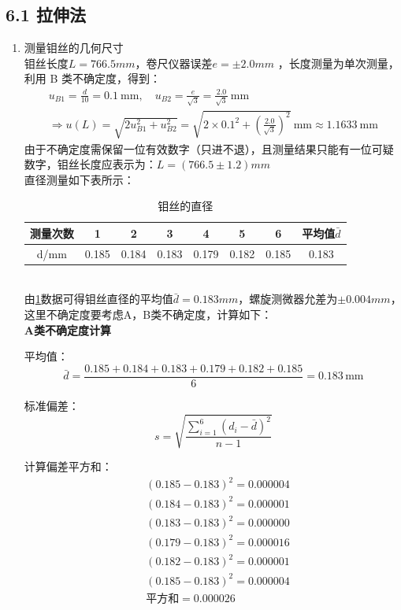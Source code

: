 \documentclass[11pt]{article}
\begin{document}
\subsection*{6.1 拉伸法} 
\begin{enumerate}
    \item  测量钼丝的几何尺寸 \\
    钼丝长度$L=766.5mm$，卷尺仪器误差$e=\pm 2.0mm$ ，长度测量为单次测量，利用 B 类不确定度，得到：
    \begin{gather}
    u_{B1} = \frac{d}{10} = 0.1 \ \mathrm{mm} ,\quad 
    u_{B2} = \frac{e}{\sqrt{3}} = \frac{2.0}{\sqrt{3}} \ \mathrm{mm} \\
    \Longrightarrow 
    u(L) = \sqrt{2u_{B1}^2 + u_{B2}^2} = \sqrt{2\times 0.1^2 + \left(\frac{2.0}{\sqrt{3}}\right)^2} \ \mathrm{mm} \approx 1.1633 \ \mathrm{mm}
    \end{gather}
    由于不确定度需保留一位有效数字（只进不退），且测量结果只能有一位可疑数字，钼丝长度应表示为：$L = (766.5 \pm 1.2)mm$ \\
    直径测量如下表所示：
    \begin{table}[h]
    \centering
    \begin{tabular}{@{}cccccccc@{}}
    \toprule
    测量次数 & 1     & 2     & 3     & 4     & 5     & 6     & 平均值$\bar{d}$ \\ \midrule
    d/mm & 0.185 & 0.184 & 0.183 & 0.179 & 0.182 & 0.185 & 0.183        \\ \bottomrule
    \end{tabular}
    \caption{钼丝的直径}
    \label{tab:dia of mu}
    \end{table} \\
    由\cref{tab:dia of mu}数据可得钼丝直径的平均值$\bar{d}=0.183mm$，螺旋测微器允差为$\pm 0.004mm$，这里不确定度要考虑A，B类不确定度，计算如下：\\
    \textbf{A类不确定度计算}
    
    平均值：
    \[
    \bar{d} = \frac{0.185 + 0.184 + 0.183 + 0.179 + 0.182 + 0.185}{6} = 0.183 \, \text{mm}
    \]
    
    标准偏差：
    \[
    s = \sqrt{\frac{\sum_{i=1}^{6}(d_i - \bar{d})^2}{n-1}}
    \]
    
    计算偏差平方和：
    \begin{align*}
    &(0.185-0.183)^2 = 0.000004 \\
    &(0.184-0.183)^2 = 0.000001 \\
    &(0.183-0.183)^2 = 0.000000 \\
    &(0.179-0.183)^2 = 0.000016 \\
    &(0.182-0.183)^2 = 0.000001 \\
    &(0.185-0.183)^2 = 0.000004 \\
    &\text{平方和} = 0.000026
    \end{align*}
    

\end{enumerate}
\end{document}
